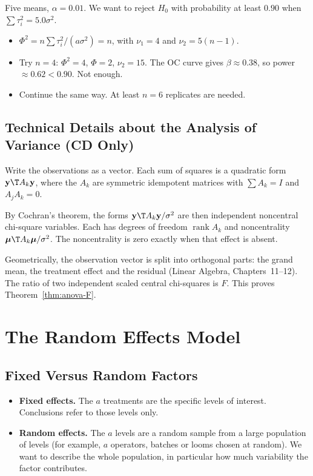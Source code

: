 \begin{example}
Five means, $\alpha=0.01$. We want to reject $H_0$ with probability at least $0.90$ when $\sum\tau_i^2=5.0\sigma^2$.
\begin{itemize}
  \item $\Phi^2=n\sum\tau_i^2/(a\sigma^2)=n$, with $\nu_1=4$ and $\nu_2=5(n-1)$.
  \item Try $n=4$: $\Phi^2=4$, $\Phi=2$, $\nu_2=15$. The OC curve gives $\beta\approx0.38$, so power $\approx0.62<0.90$. Not enough.
  \item Continue the same way. At least $n=6$ replicates are needed.
\end{itemize}
\end{example}

\subsection{Technical Details about the Analysis of Variance (CD Only)}

Write the observations as a vector. Each sum of squares is a quadratic form $\mathbf{y}\T A_k\mathbf{y}$, where the $A_k$ are symmetric idempotent matrices with $\sum A_k=I$ and $A_jA_k=0$.

By Cochran's theorem, the forms $\mathbf{y}\T A_k\mathbf{y}/\sigma^2$ are then independent noncentral chi-square variables. Each has degrees of freedom $\operatorname{rank}A_k$ and noncentrality $\boldsymbol\mu\T A_k\boldsymbol\mu/\sigma^2$. The noncentrality is zero exactly when that effect is absent.

Geometrically, the observation vector is split into orthogonal parts: the grand mean, the treatment effect and the residual (Linear Algebra, Chapters~11--12). The ratio of two independent scaled central chi-squares is $F$. This proves Theorem~\ref{thm:anova-F}.

\section{The Random Effects Model}

\subsection{Fixed Versus Random Factors}

\begin{itemize}
  \item \textbf{Fixed effects.} The $a$ treatments are the specific levels of interest. Conclusions refer to those levels only.
  \item \textbf{Random effects.} The $a$ levels are a random sample from a large population of levels (for example, $a$ operators, batches or looms chosen at random). We want to describe the whole population, in particular how much variability the factor contributes.
\end{itemize}

